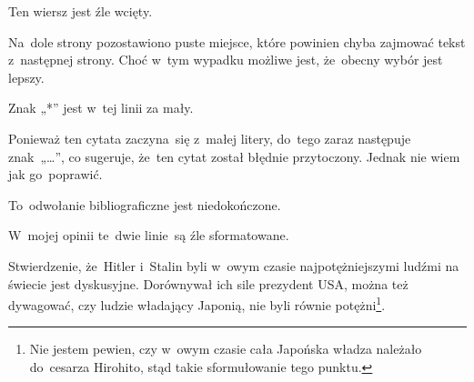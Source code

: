 \documentclass[a4paper,11pt]{article}
\begin{document}
\vspace{\spaceFour}





\noindent
{} Ten wiersz jest źle wcięty.

\vspace{\spaceFour}





\noindent
{} Na~dole strony pozostawiono puste miejsce, które powinien chyba
zajmować tekst z~następnej strony. Choć w~tym wypadku możliwe jest,
że~obecny wybór jest lepszy.

\vspace{\spaceFour}





\noindent
{} Znak „*” jest w~tej linii za mały.

\vspace{\spaceFour}





\noindent
{} Ponieważ ten cytata zaczyna~się z~małej litery, do~tego
zaraz następuje znak~„\ldots”, co sugeruje, że~ten cytat został błędnie
przytoczony. Jednak nie wiem jak go~poprawić.

\vspace{\spaceFour}





\noindent
{} To~odwołanie bibliograficzne jest niedokończone.

\vspace{\spaceFour}





\noindent
{} W~mojej opinii te~dwie linie~są źle sformatowane.

\vspace{\spaceFour}



\noindent
{} Stwierdzenie, że~Hitler i~Stalin byli w~owym czasie
najpotężniejszymi ludźmi na świecie jest dyskusyjne. Dorównywał ich
sile prezydent USA, można też dywagować, czy ludzie władający Japonią,
nie byli równie potężni\footnote{Nie jestem pewien, czy w~owym czasie
  cała Japońska władza należało do~cesarza Hirohito, stąd takie
  sformułowanie tego punktu.}.

\vspace{\spaceFour}
\end{document}
